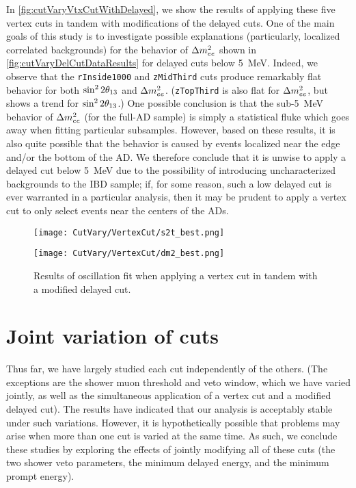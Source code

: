 \documentclass[../thesis.tex]{subfiles}
\begin{document}
In \autoref{fig:cutVaryVtxCutWithDelayed}, we show the results of applying these five vertex cuts in tandem with modifications of the delayed cuts. One of the main goals of this study is to investigate possible explanations (particularly, localized correlated backgrounds) for the behavior of $\Delta m^2_{ee}$ shown in \autoref{fig:cutVaryDelCutDataResults} for delayed cuts below 5~MeV. Indeed, we observe that the \texttt{rInside1000} and \texttt{zMidThird} cuts produce remarkably flat behavior for both $\sin^2 2\theta_{13}$ and $\Delta m^2_{ee}$. (\texttt{zTopThird} is also flat for $\Delta m^2_{ee}$, but shows a trend for $\sin^2 2\theta_{13}$.) One possible conclusion is that the sub-5~MeV behavior of $\Delta m^2_{ee}$ (for the full-AD sample) is simply a statistical fluke which goes away when fitting particular subsamples. However, based on these results, it is also quite possible that the behavior is caused by events localized near the edge and/or the bottom of the AD. We therefore conclude that it is unwise to apply a delayed cut below 5~MeV due to the possibility of introducing uncharacterized backgrounds to the IBD sample; if, for some reason, such a low delayed cut is ever warranted in a particular analysis, then it may be prudent to apply a vertex cut to only select events near the centers of the ADs.

\begin{figure}[ht]
  \begin{minipage}{0.47\linewidth}%
    \texttt{[image: CutVary/VertexCut/s2t\_best.png]}%
  \end{minipage}%
  \begin{minipage}{0.47\linewidth}%
    \texttt{[image: CutVary/VertexCut/dm2\_best.png]}%
  \end{minipage}%
  \caption{Results of oscillation fit when applying a vertex cut in tandem with a modified delayed cut.}
  \label{fig:cutVaryVtxCutWithDelayed}
\end{figure}

\section{Joint variation of cuts}
\label{sec:cutVaryJoint}

Thus far, we have largely studied each cut independently of the others. (The exceptions are the shower muon threshold and veto window, which we have varied jointly, as well as the simultaneous application of a vertex cut and a modified delayed cut). The results have indicated that our analysis is acceptably stable under such variations. However, it is hypothetically possible that problems may arise when more than one cut is varied at the same time. As such, we conclude these studies by exploring the effects of jointly modifying all of these cuts (the two shower veto parameters, the minimum delayed energy, and the minimum prompt energy). 
\end{document}
